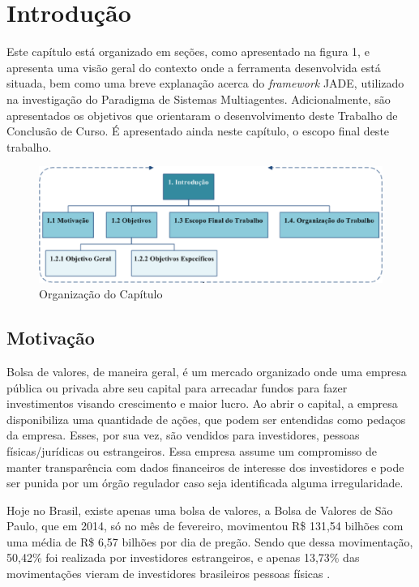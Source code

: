 \chapter[INTRODUÇÃO]{Introdução}

Este capítulo está organizado em seções, como apresentado na figura 1, e apresenta uma visão geral do contexto onde a ferramenta desenvolvida está situada, bem como uma breve explanação acerca do \textit{framework} JADE, utilizado na investigação do Paradigma de Sistemas Multiagentes. Adicionalmente, são apresentados os objetivos que orientaram o desenvolvimento deste Trabalho de Conclusão de Curso. É apresentado ainda neste capítulo, o escopo final deste trabalho.

\begin{figure}[h!]
\centering
\label{f10}
\includegraphics[width=1\textwidth]{figuras/cap1}
\caption{Organização do Capítulo}
\end{figure}
\FloatBarrier

\section{Motivação}


Bolsa de valores, de maneira geral, é um mercado organizado onde uma empresa pública ou privada abre seu capital para arrecadar fundos para fazer investimentos visando crescimento e maior lucro. Ao abrir o capital, a empresa disponibiliza uma quantidade de ações, que podem ser entendidas como pedaços da empresa. Esses, por sua vez, são vendidos para investidores, pessoas físicas/jurídicas ou estrangeiros. Essa empresa assume um compromisso de manter transparência com dados financeiros de interesse dos investidores e pode ser punida por um órgão regulador caso seja identificada alguma irregularidade.

Hoje no Brasil, existe apenas uma bolsa de valores, a Bolsa de Valores de São Paulo, que em 2014, só no mês de fevereiro, movimentou R\$ 131,54 bilhões com uma média de R\$ 6,57 bilhões por dia de pregão. Sendo que dessa movimentação, 50,42\% foi realizada por investidores estrangeiros, e apenas 13,73\% das movimentações vieram de investidores brasileiros pessoas físicas \cite{bovespa2014}.

